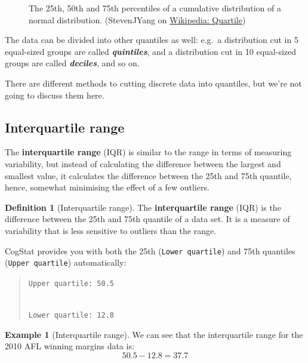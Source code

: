 \documentclass[
  11pt,
]{book}
\theoremstyle{definition}
\newtheorem{definition}{Definition}[chapter]
\theoremstyle{definition}
\newtheorem{example}{Example}[chapter]
\theoremstyle{definition}
\theoremstyle{definition}
\theoremstyle{remark}
\begin{document}
\begin{callout}[Quantiles]
\begin{figure}
{}

\caption{The 25th, 50th and 75th percentiles of a cumulative distribution of a normal distribution. (StevenJYang on \href{https://en.wikipedia.org/wiki/Quartile}{Wikipedia: Quartile})}\label{fig:unnamed-chunk-17}
\end{figure}

The data can be divided into other quantiles as well: e.g.~a distribution cut in 5 equal-sized groups are called \textbf{\emph{quintiles}}, and a distribution cut in 10 equal-sized groups are called \textbf{\emph{deciles}}, and so on.

There are different methods to cutting discrete data into quantiles, but we're not going to discuss them here.

\end{callout}

\hypertarget{IQR}{%
\subsection{Interquartile range}\label{IQR}}

The \textbf{interquartile range} (IQR) is similar to the range in terms of measuring variability, but instead of calculating the difference between the largest and smallest value, it calculates the difference between the 25th and 75th quantile, hence, somewhat minimising the effect of a few outliers.

\begin{definition}[Interquartile range]
\protect\hypertarget{def:defIQR}{}\label{def:defIQR}The \textbf{interquartile range} (IQR) is the difference between the 25th and 75th quantile of a data set. It is a measure of variability that is less sensitive to outliers than the range.
\end{definition}

CogStat provides you with both the 25th (\texttt{Lower\ quartile}) and 75th quantiles (\texttt{Upper\ quartile}) automatically:

\begin{quote}
\texttt{Upper\ quartile:\ 50.5}\strut \\
\texttt{Lower\ quartile:\ 12.8}
\end{quote}

\begin{example}[Interquartile range]
\protect\hypertarget{exm:exIQR}{}\label{exm:exIQR}We can see that the interquartile range for the 2010 AFL winning margins data is:
\[
50.5 - 12.8 = \mathbf{37.7}
\]
\end{example}
\end{document}
